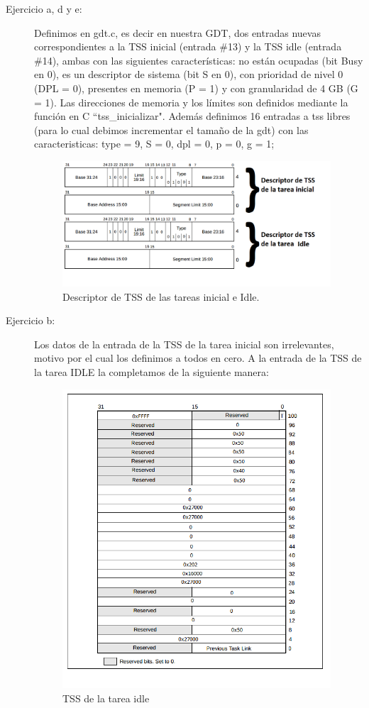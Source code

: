 \documentclass[a4paper]{article}
\begin{document}
\begin{description}

  \item[Ejercicio a, d y e:] Definimos en gdt.c, es decir en nuestra GDT, dos entradas nuevas correspondientes a la TSS inicial (entrada \#13) y la TSS idle (entrada \#14), ambas con las siguientes características: no están ocupadas (bit Busy en 0), es un descriptor de sistema (bit S en 0), con prioridad de nivel 0 (DPL = 0), presentes en memoria (P = 1) y con granularidad de 4 GB (G = 1). Las direcciones de memoria y los límites son definidos mediante la función en C ``tss_inicializar". Además definimos 16 entradas a tss libres (para lo cual debimos incrementar el tamaño de la gdt) con las caracteristicas:  type = 9, S = 0, dpl = 0, p = 0, g = 1;

\begin{figure}[ht!]
\centering
\includegraphics[width=100mm]{imagenes/Descriptortss.png}
\caption {Descriptor de TSS de las tareas inicial e Idle.}
\end{figure}
  
  \item[Ejercicio b:] Los datos de la entrada de la TSS de la tarea inicial son irrelevantes, motivo por el cual los definimos a todos en cero. A la entrada de la TSS de la tarea IDLE la completamos de la siguiente manera:

\begin{figure}[ht!]
\centering
\includegraphics[width=100mm]{imagenes/tssincompleta.png}
\caption {TSS de la tarea idle}
\end{figure}
  

\end{description}
\end{document}
